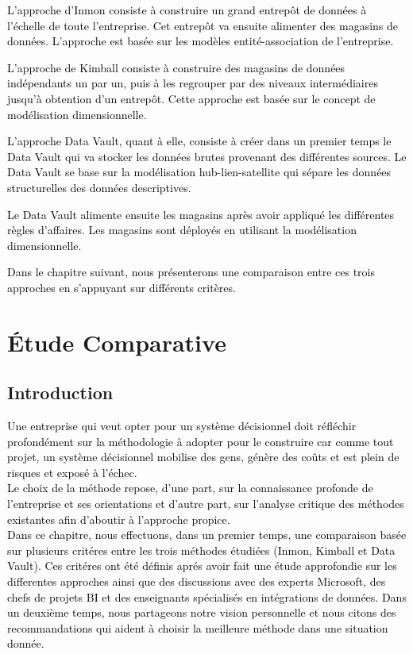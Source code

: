 \documentclass[a4paper,12pt]{report}
\begin{document}
\textcolor{black}{L’approche d’Inmon consiste à construire un grand entrepôt de données à l’échelle de toute l’entreprise. Cet entrepôt va ensuite alimenter des magasins de données. L’approche est basée sur les modèles entité-association de l’entreprise.}


\textcolor{black}{L’approche de Kimball  consiste à construire des magasins de données indépendants un par un, puis à  les  regrouper par des niveaux intermédiaires jusqu'à obtention d'un entrepôt. Cette approche est basée sur le concept de modélisation dimensionnelle.}


\textcolor{black}{L’approche Data Vault, quant à elle, consiste à créer dans un premier temps le Data Vault qui va stocker les données brutes provenant des différentes sources. Le Data Vault se base sur la modélisation hub-lien-satellite qui sépare les données structurelles des données descriptives.}


\textcolor{black}{Le Data Vault alimente ensuite les magasins après avoir appliqué les différentes règles d’affaires. Les magasins sont déployés en utilisant la modélisation dimensionnelle.}


\textcolor{black}{Dans le chapitre suivant, nous présenterons une comparaison entre ces trois approches en s’appuyant sur différents critères.}


\chapter{Étude Comparative}
\section*{Introduction}

\textcolor{black}{Une entreprise qui veut opter pour un système décisionnel doit réfléchir profondément sur la méthodologie à adopter pour le construire car comme tout projet, un système décisionnel mobilise des gens, génère des coûts et est plein de risques et exposé à l’échec.}
\\

\textcolor{black}{Le choix de la méthode repose, d’une part, sur la connaissance profonde de l’entreprise et ses orientations et d’autre part, sur l’analyse critique des méthodes existantes afin d’aboutir à l’approche propice.}  
\\

\textcolor{black}{Dans ce chapitre, nous effectuons, dans un premier temps, une comparaison basée sur plusieurs critéres entre les trois méthodes étudiées (Inmon, Kimball et Data Vault). Ces critéres ont été définis aprés avoir fait une étude approfondie sur les differentes approches ainsi que des discussions avec des experts Microsoft, des chefs de projets BI et des enseignants spécialisés en intégrations de données. Dans un deuxième temps, nous partageons notre vision personnelle et nous citons des recommandations qui aident à choisir la meilleure méthode dans une situation donnée.}
\end{document}
